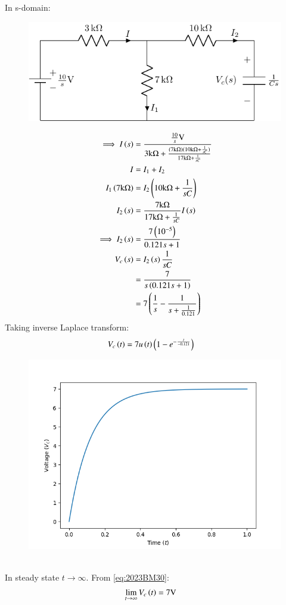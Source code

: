 \documentclass[journal,12pt,twocolumn]{IEEEtran}
\theoremstyle{remark}
\begin{document}
In s-domain:
\begin{figure}[h!]
    \centering
    \includegraphics[width=\columnwidth]{2023/BM/30/figs/c_fig2.pdf}
\end{figure}
\begin{align}
\implies I\left(s\right) &= \frac{\frac{10}{s}\text{V}}{3\text{k}\ohm + \frac{(7\text{k}\ohm)(10\text{k}\ohm + \frac{1}{sC})}{17\text{k}\ohm + \frac{1}{sC}}} \\
I &= I_1 + I_2 \\
I_1\left(7\text{k}\ohm\right) &= I_2\left(10\text{k}\ohm + \frac{1}{sC}\right) \\
I_2\left(s\right) &= \frac{7\text{k}\ohm}{17\text{k}\ohm + \frac{1}{sC}}I\left(s\right) \\
\implies I_2\left(s\right) &= \frac{7\left(10^{-5}\right)}{0.121s + 1} \\
V_c\left(s\right) &= I_2\left(s\right)\frac{1}{sC} \\
&= \frac{7}{s\left(0.121s + 1\right)} \\
&= 7\left(\frac{1}{s} - \frac{1}{s + \frac{1}{0.121}}\right)
\end{align}
Taking inverse Laplace transform:
\begin{align}
V_c\brak{t} &= 7u\brak{t}\brak{1 - e^{-\frac{t}{-0.121}}} \label{eq:2023BM30}
\end{align}
\begin{figure}[h!]
\centering
\includegraphics[width=\columnwidth]{2023/BM/30/figs/plot.png}
\label{fig:2023BM30}
\end{figure}
\\
In steady state $t \to \infty$. From \eqref{eq:2023BM30}:
\begin{align}
\lim_{t\to\infty}V_c\left(t\right) &= 7\text{V}
\end{align}
\end{document}
